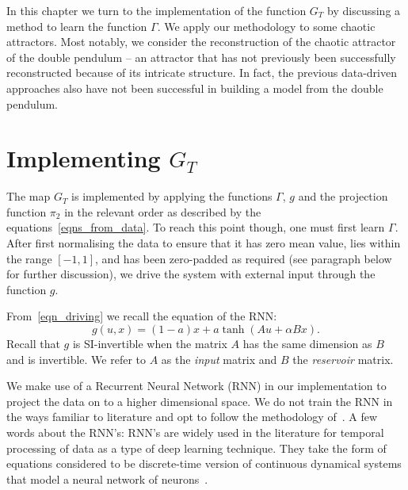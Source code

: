 In this chapter we turn to the implementation of the function $G_T$ by discussing a method to learn the function $\Gamma$. We apply our methodology to some chaotic attractors. 
Most notably, we consider the reconstruction of the chaotic attractor of the double pendulum -- an  attractor that has not previously been successfully reconstructed because of its intricate structure. 
In fact, the previous data-driven approaches also have not been successful in building a model from the double pendulum. 


\section{Implementing $G_T$}
The map $G_T$ is implemented by applying the functions $\Gamma$, $g$ and the projection function $\pi_2$ in the relevant order as described by the equations~\eqref{eqns_from_data}. To reach this point though, one must first learn $\Gamma$.
After first normalising the data to ensure that it has zero mean value, lies within the range $[-1,1]$, and has been zero-padded as required (see paragraph below for further discussion), we drive the system with external input through the function $g$.

From~\eqref{eqn_driving} we recall the equation of the RNN: \[g(u,x) = (1-a) x + a \tanh(Au + \alpha B x).\]
Recall that $g$ is SI-invertible when the matrix $A$ has the same dimension as $B$ and is invertible. We refer to $A$ as the \textit{input} matrix and $B$ the \textit{reservoir} matrix. 

We make use of a Recurrent Neural Network (RNN) in our implementation to project the data on to a higher dimensional space. We do not train the RNN in the ways familiar to literature and opt to follow the methodology of~\cite{manjunath2021universal}. 
A few words about the RNN's: RNN's are widely used in the literature for temporal processing of data as a type of deep learning technique. 
They take the form of equations considered to be discrete-time version of continuous dynamical systems that model a neural network of neurons~\cite{jaeger2001echo}.

